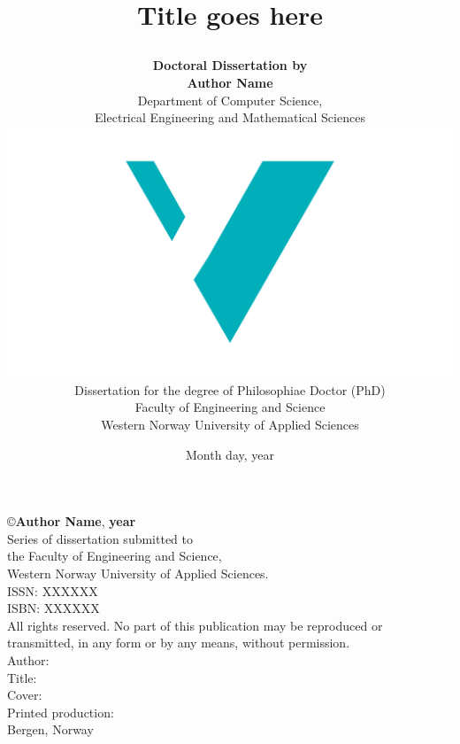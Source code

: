 \documentclass[12pt]{book} %
\title{
{\fontsize{28}{30}\bfseries Title goes here}
	\author{
        \textbf{Doctoral Dissertation by} \\ \textbf{Author Name}\vspace{1cm}\\
		Department of Computer Science, \\ 
		Electrical Engineering and Mathematical Sciences \vspace{1cm}\\
		\includegraphics[scale=0.36]{logos/logo.pdf}\vspace{2em}\\
		Dissertation for the degree of Philosophiae Doctor (PhD)\vspace{0.5em}\\
		Faculty of Engineering and Science \vspace{0.3cm}\\
		Western Norway University of Applied Sciences
	}
	\date{Month day, year}
}
\begin{document}

\newcommand{\TextSize}{13}
\newcommand{\BaseLineSkip}{15}
\fontsize{\TextSize}{\BaseLineSkip}
\selectfont

\maketitle
\thispagestyle{empty}
\normalsize\vspace*{12cm}
\begin{minipage}{13cm}
\copyright{\textbf{Author Name}}, \textbf{year}\\[5ex] %
Series of dissertation submitted to\\
the Faculty of Engineering and Science,\\
Western Norway University of Applied Sciences.\\[3ex]
ISSN: XXXXXX\\ %
ISBN: XXXXXX\\[3ex] %
All rights reserved. No part of this publication may be reproduced or
transmitted, in any form or by any means, without permission.\\[3ex]

Author: \\
Title: \\[5ex]

Cover: \\
Printed production: \\[3ex]
Bergen, Norway
\end{minipage}



\frontmatter





\tableofcontents
\end{document}
